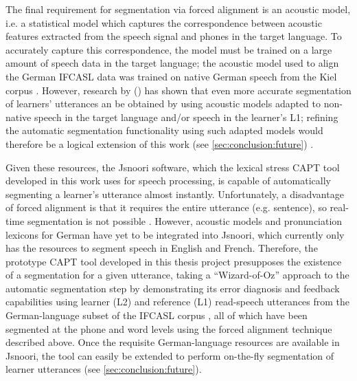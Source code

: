 	The final requirement for segmentation via forced alignment is an acoustic model, i.e. a statistical model 
	which captures the correspondence between acoustic features extracted from the speech signal and phones in the target language. 
	To accurately capture this correspondence, the model must be trained on a large amount of speech data in the target language; 
	the acoustic model used to align the German IFCASL data was trained on native German speech from the Kiel corpus .
	However, research by \citeauthor{Bouselmi2005} (\citeyear{Bouselmi2005,Bouselmi2012}) has shown that even more accurate segmentation of learners' utterances an be obtained by using acoustic models adapted to non-native speech in the target language and/or speech in the learner's L1; refining the automatic segmentation functionality using such adapted models would therefore be a logical extension of this work (see \cref{sec:conclusion:future}) .
	

	
	Given these resources, the Jsnoori software,
	 which the lexical stress CAPT tool developed in this work uses for speech processing,
	is capable of automatically segmenting a learner's utterance almost instantly. Unfortunately, a disadvantage of forced alignment is that it requires the entire utterance (e.g. sentence), so real-time segmentation is not possible . However, acoustic models and pronunciation lexicons for German have yet to be integrated into Jsnoori, which 
	currently only has the resources to segment 
	speech in English and French.
	 Therefore,
	 the prototype CAPT tool developed in this thesis project presupposes the existence of a segmentation for a given utterance,
	taking a ``Wizard-of-Oz'' approach to the automatic segmentation step by demonstrating its error diagnosis and feedback capabilities using learner (L2) and reference (L1) read-speech utterances from the German-language subset of the IFCASL corpus \citep{Fauth2014,Trouvain2013}, all of which have been segmented at the phone and word levels using the forced alignment technique described above.
	Once the requisite German-language resources are available in Jsnoori, the tool can easily be extended to perform on-the-fly segmentation of learner utterances (see \cref{sec:conclusion:future}).
	
